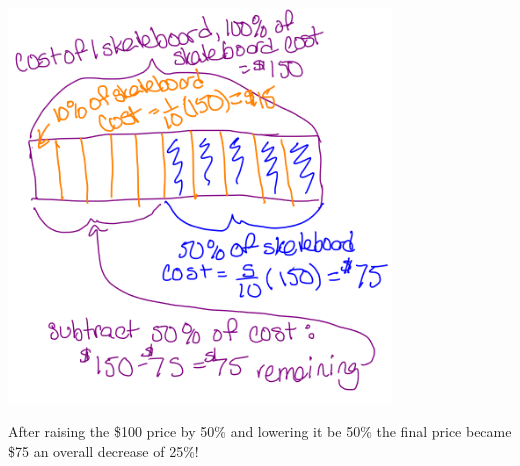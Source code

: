 \documentclass{ximera}
\begin{document}
\begin{example}
\begin{explanation}
\begin{image}
    \includegraphics[width=4in]{skateboard2.png}
\end{image}



After raising the \$100 price by 50\% and lowering it be 50\% the final price became \$75 an overall decrease of 25\%!
\end{explanation}
\end{example}
\end{document}
